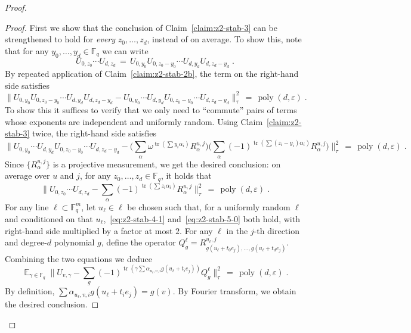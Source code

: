 \documentclass[11pt]{article}
\theoremstyle{definition}
\DeclareMathOperator*{\Expectation}{\mathbb{E}}
\newcommand{\Es}[1]{\Expectation_{#1}}
\newcommand{\F}{\ensuremath{\mathbb{F}}}
\DeclareMathOperator{\poly}{poly}
\newcommand{\eps}{\varepsilon}
\DeclareMathOperator{\tr}{tr}
\begin{document}
\begin{proof}
\begin{proof}
First we show that the conclusion of Claim~\ref{claim:z2-stab-3} can be strengthened to hold for \emph{every} $z_0,\ldots,z_{d}$, instead of on average. To show this, note that for any $y_0,\ldots,y_d\in \F_q$ we can write 
\[ U_{0,z_0}\cdots U_{d,z_d}\,=\, U_{0,y_0}U_{0,z_0-y_0}\cdots U_{d,y_d}U_{d,z_d-y_d}\;.\]
By repeated application of Claim~\ref{claim:z2-stab-2b}, the term on the right-hand side satisfies 
\[ \big\| U_{0,y_0}U_{0,z_0-y_0}\cdots U_{d,y_d}U_{d,z_d-y_d}  - U_{0,y_0}\cdots U_{d,y_d}U_{0,z_0-y_0}\cdots U_{d,z_d-y_d}\big\|_\tau^2 \,=\,\poly(d,\eps)\;.\]
To show this it suffices to verify that we only need to ``commute'' pairs of terms whose exponents are independent and uniformly random. Using Claim~\ref{claim:z2-stab-3} twice, the right-hand side satisfies 
\[ \big\| U_{0,y_0}\cdots U_{d,y_d}U_{0,z_0-y_0}\cdots U_{d,z_d-y_d} - \Big(\sum_{\alpha} \omega^{\tr(\sum y_i\alpha_i)} R^{u,j}_\alpha\Big)\Big(\sum_{\alpha} (-1)^{\tr(\sum (z_i-y_i)\alpha_i)} R^{u,j}_\alpha\Big) \big\|_\tau^2 \,=\,\poly(d,\eps)\;.\]
Since $\{R^{u,j}_\alpha\}$ is a projective measurement, we get the desired conclusion: on average over $u$ and $j$, for any $z_0,\ldots,z_d\in\F_q$, it holds that
\begin{equation}\label{eq:z2-stab-4-1}
 \Big\| U_{0,z_0}\cdots U_{d,z_d} -  \sum_{\alpha} (-1)^{\tr(\sum z_i\alpha_i)} R^{u,j}_\alpha\Big\|_\tau^2 \,=\, \poly(d,\eps)\;.
	\end{equation}
	For any line $\ell \subset \F_q^m$, let $u_\ell\in \ell$ be chosen such that, for a uniformly random $\ell$ and conditioned on that $u_\ell$,~\eqref{eq:z2-stab-4-1} and~\eqref{eq:z2-stab-5-0} both hold, with right-hand side multiplied by a factor at most $2$. For any $\ell$ in the $j$-th direction and degree-$d$ polynomial $g$, define the operator $Q^\ell_g = R^{u_\ell,j}_{g(u_\ell+t_0 e_j),\ldots,g(u_\ell+t_de_j)}$.
	Combining the two equations we deduce
	\begin{equation}\label{eq:z2-stab-4-2}
 \Es{\gamma\in\F_q} \Big\| U_{v,\gamma} -  \sum_{g} (-1)^{\tr(\gamma \sum \alpha_{u_\ell,v,i} g(u_\ell+t_ie_j))} Q^{\ell}_g\Big\|_\tau^2 \,=\, \poly(d,\eps)\;.
	\end{equation}
	 By definition, $\sum \alpha_{u_\ell,v,i} g(u_\ell+t_ie_j) = g(v)$. By Fourier transform, we obtain the desired conclusion. 
\end{proof}



\end{proof}
\end{document}

